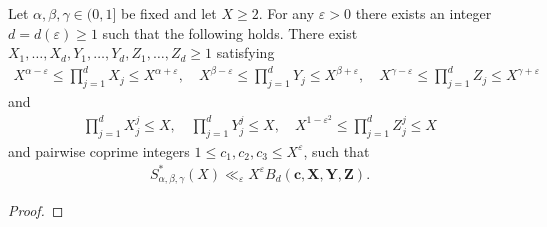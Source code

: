 \begin{proposition}\label{prop:DiophantineReduction}
Let $\alpha,\beta,\gamma\in (0,1]$ be fixed and let $X\geq 2$. For any $\varepsilon>0$ there exists an integer $d=d(\varepsilon)\geq 1$ such that the following holds.
There exist $X_1,\ldots, X_d,Y_1,\ldots, Y_d, Z_1,\ldots, Z_d\geq 1$ satisfying
\begin{align}\label{eq:xiyizi_1}
X^{\alpha-\varepsilon}\leq \prod_{j=1}^{d}X_j\leq X^{\alpha+\varepsilon},\quad
X^{\beta-\varepsilon}\leq\prod_{j=1}^{d}Y_j\leq X^{\beta+\varepsilon},\quad
X^{\gamma-\varepsilon}\leq\prod_{j=1}^{d}Z_j\leq X^{\gamma+\varepsilon}
\end{align}
and
\begin{align}\label{eq:xiyizi_2}
\prod_{j=1}^d X_j^j \leq X, \quad \prod_{j=1}^d Y_j^j\leq X,\quad X^{1-\varepsilon^2}\leq \prod_{j=1}^d Z_j^j\leq X
\end{align}
and pairwise coprime integers $1\leq c_1,c_2,c_3\leq X^{\varepsilon}$, such that
\begin{align*}
S^*_{\alpha,\beta,\gamma}(X) \ll_{\varepsilon} X^{\varepsilon}B_d(\mathbf{c},\mathbf{X},\mathbf{Y},\mathbf{Z}).
\end{align*}
\end{proposition}
\begin{proof}
\end{proof}

